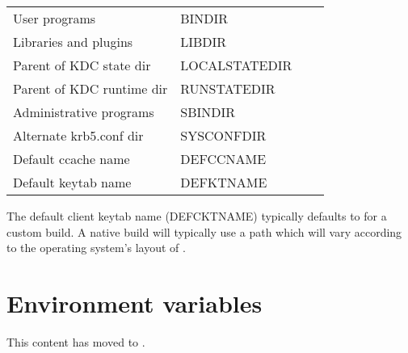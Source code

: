 \documentclass[letterpaper,10pt,english]{sphinxmanual}
\begin{document}
\begin{savenotes}\sphinxattablestart
\centering
\begin{tabulary}{\linewidth}[t]{|T|T|T|T|}
\hline
{}\relax &\relax &\relax &\relax \\
\hline
User programs
&
BINDIR
&
&
\\
\hline
Libraries and plugins
&
LIBDIR
&
&
\\
\hline
Parent of KDC state dir
&
LOCALSTATEDIR
&
&
\\
\hline
Parent of KDC runtime dir
&
RUNSTATEDIR
&
&
\\
\hline
Administrative programs
&
SBINDIR
&
&
\\
\hline
Alternate krb5.conf dir
&
SYSCONFDIR
&
&
\\
\hline
Default ccache name
&
DEFCCNAME
&
&
\\
\hline
Default keytab name
&
DEFKTNAME
&
&
\\
\hline
\end{tabulary}
\par
\sphinxattableend\end{savenotes}

The default client keytab name (DEFCKTNAME) typically defaults to
 for a custom
build.  A native build will typically use a path which will vary
according to the operating system’s layout of .


\chapter{Environment variables}
\label{\detokenize{admin/env_variables:environment-variables}}\label{\detokenize{admin/env_variables::doc}}
This content has moved to .
\end{document}
